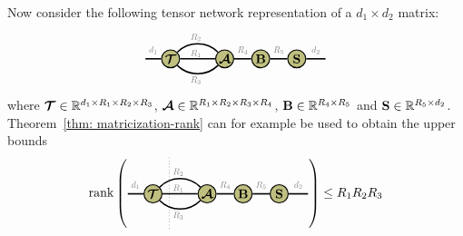 Now consider the following tensor network representation of a $d_1\times d_2$ matrix:
$$
\begin{tikzpicture}[baseline=-0.5ex]
    \tikzset{tensor/.style = {minimum size = 0.5cm,shape = circle,thick,draw=black,inner sep = 0pt}, edge/.style = {thick,line width=.4mm},every loop/.style={}}
    \def\x{6}
    \def\y{0} \node[tensor,fill=green!50!red!50!white] (T) at (\x+1,\y) {$\Tt$};
    \node[tensor,fill=green!50!red!50!white] (A) at (\x+2.5,\y) {$\At$};
    \node[tensor,fill=green!50!red!50!white] (B) at (\x+3.5,\y) {$\Bb$};
      \node[tensor,fill=green!50!red!50!white] (S) at (\x+4.5,\y) {$\Sb$};
    \draw[edge] (T) -- (\x+0.3,\y)node [midway,above] {\scalebox{0.7}{\dimcolor{$d_1$}}};
     \draw[edge] (T) -- (A);
    \draw[edge] (A) -- (B)node [midway,above] {\scalebox{0.7}{\dimcolor{$R_4$}}};
    \draw[edge] (T) to [out=-45,in=-135] (A);
    \draw[edge] (T) to [out=45,in=135] (A);
    \node[draw=none] () at (\x+1.7,\y+0.15) {\scalebox{0.7}{\dimcolor{$R_1$}}};
    \node[draw=none] () at (\x+1.7,\y+0.6) {\scalebox{0.7}{\dimcolor{$R_2$}}};
    \node[draw=none] () at (\x+1.7,\y-0.6) {\scalebox{0.7}{\dimcolor{$R_3$}}};
    \draw[edge](B) -- (S) node [midway,above] {\scalebox{0.7}{\dimcolor{$R_5$}}};
    \draw[edge] (S) -- (\x+5.3,\y) node [midway,above] {\scalebox{0.7}{\dimcolor{$d_2$}}};
    \end{tikzpicture}$$
where $\bm{\mathcal{T}}\in\mathbb{R}^{d_1\times R_1\times R_2\times R_3}$, $\bm{\mathcal{A}}\in\mathbb{R}^{R_1\times R_2\times R_3\times R_4}$, $\mathbf{B}\in\mathbb{R}^{R_4\times R_5}$ and $\mathbf{S}\in\mathbb{R}^{R_5\times d_2}$.
Theorem~\ref{thm: matricization-rank} can for example be used to obtain the upper bounds
$$
\rank\left(\begin{tikzpicture}[baseline=-0.5ex]
    \tikzset{tensor/.style = {minimum size = 0.5cm,shape = circle,thick,draw=black,inner sep = 0pt}, edge/.style = {thick,line width=.4mm},every loop/.style={}}
    \def\x{6}
    \def\y{0} \node[tensor,fill=green!50!red!50!white] (T) at (\x+1,\y) {$\Tt$};
    \node[tensor,fill=green!50!red!50!white] (A) at (\x+2.5,\y) {$\At$};
    \node[tensor,fill=green!50!red!50!white] (B) at (\x+3.5,\y) {$\Bb$};
      \node[tensor,fill=green!50!red!50!white] (S) at (\x+4.5,\y) {$\Sb$};
    \draw[edge] (T) -- (\x+0.3,\y)node [midway,above] {\scalebox{0.7}{\dimcolor{$d_1$}}};
     \draw[edge] (T) -- (A);
    \draw[edge] (A) -- (B)node [midway,above] {\scalebox{0.7}{\dimcolor{$R_4$}}};
    \draw[edge] (T) to [out=-45,in=-135] (A);
    \draw[edge] (T) to [out=45,in=135] (A);
    \node[draw=none] () at (\x+1.7,\y+0.15) {\scalebox{0.7}{\dimcolor{$R_1$}}};
    \node[draw=none] () at (\x+1.7,\y+0.6) {\scalebox{0.7}{\dimcolor{$R_2$}}};
    \node[draw=none] () at (\x+1.7,\y-0.6) {\scalebox{0.7}{\dimcolor{$R_3$}}};
    \draw[edge](B) -- (S) node [midway,above] {\scalebox{0.7}{\dimcolor{$R_5$}}};
    \draw[edge] (S) -- (\x+5.3,\y) node [midway,above] {\scalebox{0.7}{\dimcolor{$d_2$}}};
    \draw[dotted] (\x+1.45,\y+1) -- (\x+1.45,\y-1);
    \end{tikzpicture}\right)\leq R_1R_2R_3$$
